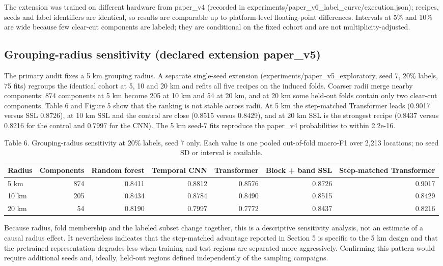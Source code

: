 \documentclass[11pt,a4paper]{article}
\begin{document}
The extension was trained on different hardware from paper\_v4 (recorded in experiments/paper\_v6\_label\_curve/execution.json); recipes, seeds and label identifiers are identical, so results are comparable up to platform-level floating-point differences. Intervals at 5\% and 10\% are wide because few clear-cut components are labeled; they are conditional on the fixed cohort and are not multiplicity-adjusted.

\subsection{Grouping-radius sensitivity (declared extension paper\_v5)}
The primary audit fixes a 5 km grouping radius. A separate single-seed extension (experiments/paper\_v5\_exploratory, seed 7, 20\% labels, 75 fits) regroups the identical cohort at 5, 10 and 20 km and refits all five recipes on the induced folds. Coarser radii merge nearby components: 874 components at 5 km become 205 at 10 km and 54 at 20 km, and at 20 km some held-out folds contain only two clear-cut components. Table 6 and Figure 5 show that the ranking is not stable across radii. At 5 km the step-matched Transformer leads (0.9017 versus SSL 0.8726), at 10 km SSL and the control are close (0.8515 versus 0.8429), and at 20 km SSL is the strongest recipe (0.8437 versus 0.8216 for the control and 0.7997 for the CNN). The 5 km seed-7 fits reproduce the paper\_v4 probabilities to within 2.2e-16.

\begin{table}[htbp]
\centering
\small
\caption{Table 6. Grouping-radius sensitivity at 20\% labels, seed 7 only. Each value is one pooled out-of-fold macro-F1 over 2,213 locations; no seed SD or interval is available.}
\begin{tabular}{lrrrrrr}
\toprule
Radius & Components & Random forest & Temporal CNN & Transformer & Block + band SSL & Step-matched Transformer \\ \midrule
5 km & 874 & 0.8411 & 0.8812 & 0.8576 & 0.8726 & 0.9017 \\
10 km & 205 & 0.8434 & 0.8784 & 0.8490 & 0.8515 & 0.8429 \\
20 km & 54 & 0.8190 & 0.7997 & 0.7772 & 0.8437 & 0.8216 \\
\bottomrule
\end{tabular}
\end{table}

Because radius, fold membership and the labeled subset change together, this is a descriptive sensitivity analysis, not an estimate of a causal radius effect. It nevertheless indicates that the step-matched advantage reported in Section 5 is specific to the 5 km design and that the pretrained representation degrades less when training and test regions are separated more aggressively. Confirming this pattern would require additional seeds and, ideally, held-out regions defined independently of the sampling campaigns.
\end{document}
